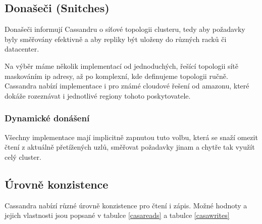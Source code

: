 \subsection{Donašeči (Snitches)}
Donašeči informují Cassandru o síťové topologii clusteru, tedy aby požadavky byly směřovány efektivně a aby repliky být uloženy do různých racků či datacenter. 

Na výběr máme několik implementací od jednoduchých, řešící topologii sítě maskováním ip adresy, až po komplexní, kde definujeme topologii ručně. Cassandra nabízí implementace i pro známé cloudové řešení od amazonu, které dokáže rozeznávat i jednotlivé regiony tohoto poskytovatele.

\subsubsection{Dynamické donášení}
Všechny implementace mají implicitně zapnutou tuto volbu, která se snaží omezit čtení z aktuálně přetížených uzlů, směřovat požadavky jinam a chytře tak využít celý cluster. 

\subsection{Úrovně konzistence}
Cassandra nabízí různé úrovně konzistence pro čtení i zápis. Možné hodnoty a jejich vlastnosti jsou popsané v tabulce \ref{casareads} a tabulce \ref{casawrites}

